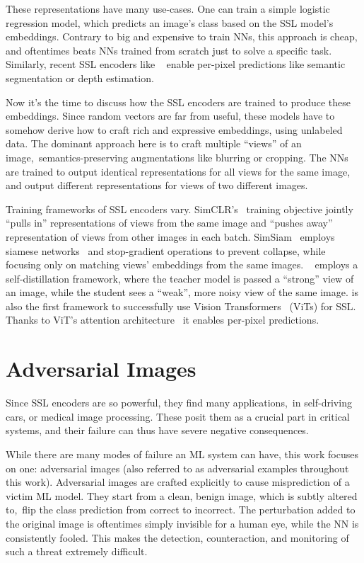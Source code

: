 These representations have many use-cases. One can train a simple logistic regression model, which predicts an image's class based on the SSL model's embeddings. Contrary to big and expensive to train NNs, this approach is cheap, and oftentimes beats NNs trained from scratch just to solve a specific task. Similarly, recent SSL encoders like \DINOvtwo~\cite{dinov2} enable per-pixel predictions like semantic segmentation or depth estimation. 

Now it's the time to discuss how the SSL encoders are trained to produce these embeddings. Since random vectors are far from useful, these models have to somehow derive how to craft rich and expressive embeddings, using unlabeled data. The dominant approach here is to craft multiple ``views'' of an image,~\ie semantics-preserving augmentations like blurring or cropping. The NNs are trained to output identical representations for all views for the same image, and output different representations for views of two different images.

Training frameworks of SSL encoders vary. SimCLR's~\cite{simclr} training objective jointly ``pulls in'' representations of views from the same image and ``pushes away'' representation of views from other images in each batch. SimSiam~\cite{simsiam} employs siamese networks~\cite{siamese} and stop-gradient operations to prevent collapse, while focusing only on matching views' embeddings from the same images. \DINOvone~\cite{dinov1} employs a self-distillation framework, where the teacher model is passed a ``strong'' view of an image, while the student sees a ``weak'', more noisy view of the same image. \DINOvone is also the first framework to successfully use Vision Transformers~\cite{vit} (ViTs) for SSL. Thanks to ViT's attention architecture~\cite{attention} it enables per-pixel predictions.

\section{Adversarial Images}

Since SSL encoders are so powerful, they find many applications,~\eg in self-driving cars, or medical image processing. These posit them as a crucial part in critical systems, and their failure can thus have severe negative consequences. 

While there are many modes of failure an ML system can have, this work focuses on one: adversarial images (also referred to as adversarial examples throughout this work). Adversarial images are crafted explicitly to cause misprediction of a victim ML model. They start from a clean, benign image, which is subtly altered to,~\eg flip the class prediction from correct to incorrect. The perturbation added to the original image is oftentimes simply invisible for a human eye, while the NN is consistently fooled. This makes the detection, counteraction, and monitoring of such a threat extremely difficult. 

